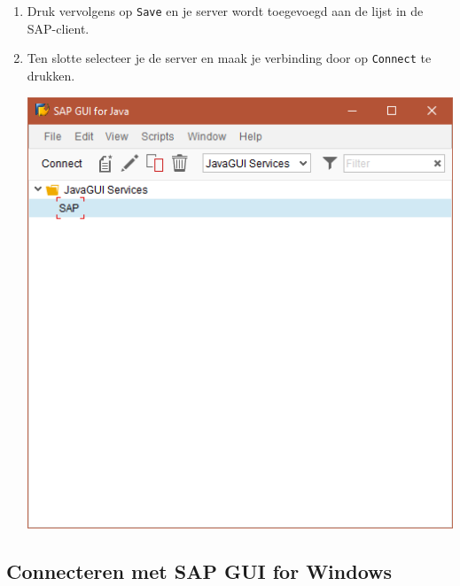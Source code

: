 \documentclass[a4paper, 11pt]{article}
\providecommand{\tightlist}{%
    \setlength{\itemsep}{0pt}
    \setlength{\parskip}{0pt}
}
\begin{document}
\begin{enumerate}
\def\labelenumi{\arabic{enumi}.}
\setcounter{enumi}{3}
\tightlist
\item
  Druk vervolgens op \texttt{Save} en je server wordt toegevoegd aan de
  lijst in de SAP-client.
\item
  Ten slotte selecteer je de server en maak je verbinding door op \texttt{Connect} te drukken.
 \begin{center}
    \includegraphics[scale=0.76,center]{img/sap.png}
\end{center}
\end{enumerate}

\subsection{Connecteren met SAP GUI for Windows}
\end{document}
